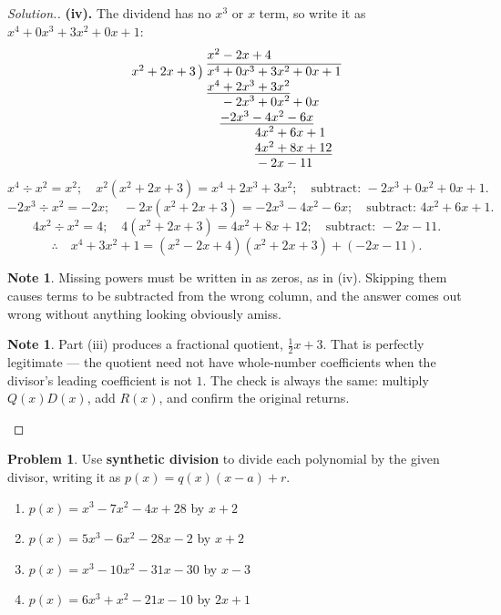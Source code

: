 \documentclass[11pt,a4paper]{article}
\theoremstyle{definition}
\newtheorem{note}[thm]{Note}
\newtheorem{problemx}{Problem}[section]
\newenvironment{problem}{\begin{problemx}}{\end{problemx}}
\newenvironment{solution}
  {\renewcommand{\qedsymbol}{}\begin{proof}[\textit{Solution}.]}
  {\end{proof}}
\begin{document}
\begin{solution}
\textbf{(iv).} The dividend has no $x^3$ or $x$ term, so write it as
$x^4+0x^3+3x^2+0x+1$:
$$\begin{array}{r@{\;}l}
 & x^{2}-2x+4\\
x^{2}+2x+3\,\big) & \overline{x^{4}+0x^{3}+3x^{2}+0x+1}\\
 & \underline{x^{4}+2x^{3}+3x^{2}}\phantom{{}+0x+1}\\
 & \phantom{x^{4}}-2x^{3}+0x^{2}+0x\phantom{{}+1}\\
 & \phantom{x^{4}}\underline{-2x^{3}-4x^{2}-6x}\phantom{{}+1}\\
 & \phantom{x^{4}-2x^{3}}4x^{2}+6x+1\\
 & \phantom{x^{4}-2x^{3}}\underline{4x^{2}+8x+12}\\
 & \phantom{x^{4}-2x^{3}}-2x-11
\end{array}$$
$$x^4\div x^2=x^2;\quad x^2\left(x^2+2x+3\right)=x^4+2x^3+3x^2;\quad
\text{subtract: } -2x^3+0x^2+0x+1.$$
$$-2x^3\div x^2=-2x;\quad -2x\left(x^2+2x+3\right)=-2x^3-4x^2-6x;\quad
\text{subtract: } 4x^2+6x+1.$$
$$4x^2\div x^2=4;\quad 4\left(x^2+2x+3\right)=4x^2+8x+12;\quad
\text{subtract: } -2x-11.$$
$$\therefore\quad x^4+3x^2+1=\left(x^2-2x+4\right)\left(x^2+2x+3\right)+(-2x-11).$$

\begin{note}
Missing powers must be written in as zeros, as in (iv). Skipping them causes terms to be
subtracted from the wrong column, and the answer comes out wrong without anything
looking obviously amiss.
\end{note}

\begin{note}
Part (iii) produces a fractional quotient, $\frac{1}{2}x+3$. That is perfectly
legitimate --- the quotient need not have whole-number coefficients when the divisor's
leading coefficient is not $1$. The check is always the same: multiply
$Q(x)D(x)$, add $R(x)$, and confirm the original returns.
\end{note}
\end{solution}

\begin{problem}
Use \textbf{synthetic division} to divide each polynomial by the given divisor, writing
it as $p(x)=q(x)(x-a)+r$.
\begin{enumerate}
\item[(i).] $p(x)=x^3-7x^2-4x+28$ by $x+2$
\item[(ii).] $p(x)=5x^3-6x^2-28x-2$ by $x+2$
\item[(iii).] $p(x)=x^3-10x^2-31x-30$ by $x-3$
\item[(iv).] $p(x)=6x^3+x^2-21x-10$ by $2x+1$
\end{enumerate}
\end{problem}
\end{document}
